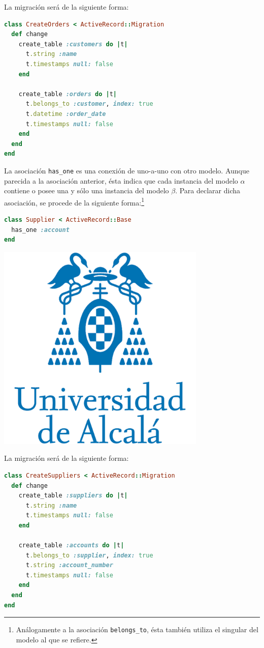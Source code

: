 La migración será de la siguiente forma:

\begin{lstlisting}[language=Ruby]
class CreateOrders < ActiveRecord::Migration
  def change
    create_table :customers do |t|
      t.string :name
      t.timestamps null: false
    end
 
    create_table :orders do |t|
      t.belongs_to :customer, index: true
      t.datetime :order_date
      t.timestamps null: false
    end
  end
end
\end{lstlisting}


La asociación \texttt{has\_one} es una conexión de uno-a-uno con otro modelo. Aunque parecida a la asociación anterior, ésta indica que cada instancia del modelo $\alpha$ contiene o posee una y sólo una instancia del modelo $\beta$. Para declarar dicha asociación, se procede de la siguiente forma:\footnote{Análogamente a la asociación \texttt{belongs\_to}, ésta también utiliza el singular del modelo al que se refiere.}

\begin{lstlisting}[language=Ruby]
class Supplier < ActiveRecord::Base
  has_one :account
end
\end{lstlisting}

\includegraphics[width=10cm]{./image/logos/uahlogo3.png}

La migración será de la siguiente forma:

\begin{lstlisting}[language=Ruby]
class CreateSuppliers < ActiveRecord::Migration
  def change
    create_table :suppliers do |t|
      t.string :name
      t.timestamps null: false
    end
 
    create_table :accounts do |t|
      t.belongs_to :supplier, index: true
      t.string :account_number
      t.timestamps null: false
    end
  end
end
\end{lstlisting}


